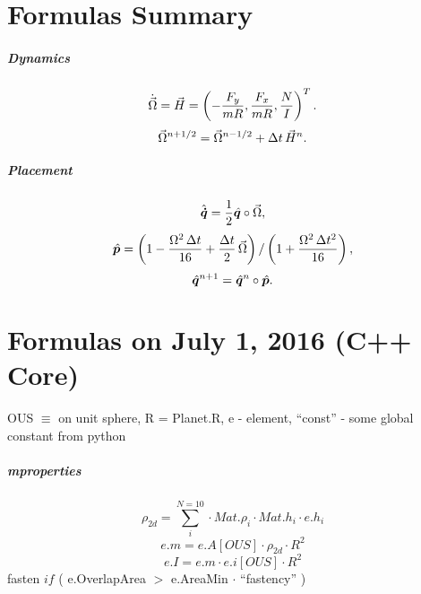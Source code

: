 
\chapter{Formulas Summary}

\paragraph{Dynamics}

\begin{equation}\label{eq:dynamicsH-x}
  \dot{{\vec{\Omega}}} = {\vec{H}} = \left( -\frac{F_y}{mR}, \frac{F_x}{mR},
  \frac{N}{I} \right)^T.
\end{equation}
\begin{equation}
  {\vec{\Omega}}^{n+1/2} = {\vec{\Omega}}^{n-1/2} + \Delta t\,{\vec{H}}^n.
\end{equation}

\paragraph{Placement}

\begin{equation}\label{eq:positionomega-x}
  {\hat{\bm{\dot q}}} = \frac{1}{2}{\hat{\bm{q}}}\circ{\vec{\Omega}},
\end{equation}
\begin{equation}
  {\hat{\bm{p}}} = \left(1 - \frac{\Omega^2\,\Delta t}{16} + \frac{\Delta
    t}{2}\,{\vec{\Omega}} \right) / \left( 1 +\frac{ \Omega^2\,\Delta
    t^2}{16}\right),
\end{equation}
\begin{equation}
  {\hat{\bm{q}}}^{n+1} = {\hat{\bm{q}}}^{n} \circ {\hat{\bm{p}}}.
\end{equation}


\chapter{Formulas on July 1, 2016 (C++ Core)}

OUS $\equiv$ on unit sphere, 
R = Planet.R, 
e - element, 
``const'' - some global constant from python

\paragraph{mproperties}

\begin{equation}
 \rho_{2d} = \sum_{i}^{N = 10} \cdot Mat.\rho_i \cdot Mat.h_i \cdot e.h_i
\end{equation}
\begin{equation}
 e.m = e.A[OUS] \cdot \rho_{2d} \cdot R^2
\end{equation}
\begin{equation}
 e.I = e.m \cdot e.i[OUS] \cdot R^2
\end{equation}
fasten $if$ ( e.OverlapArea $>$ e.AreaMin $\cdot$ ``fastency'' )

